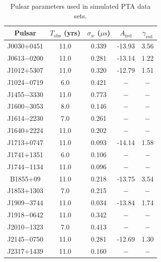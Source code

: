 \documentclass[twocolumn,aps,prd,superscriptaddress]{revtex4-1}
\begin{document}
\begin{table}[!tb]
	\setlength{\tabcolsep}{5pt}
	\caption{Pulsar parameters used in simulated PTA data sets.}
	\begin{center}
	\begin{tabular}{ccccc}
		\hline\hline
    		Pulsar	& $T_\mathrm{obs}$ (yrs) & $\sigma_w$ ($\mu\mathrm{s}$) & $A_\mathrm{red}$ & $\gamma_\mathrm{red}$ \\
		\hline
		J0030+0451 & 11.0 & 0.339 & -13.93 & 3.56 \\
		J0613$-$0200 & 11.0 & 0.281 & -13.14 & 1.22 \\
		J1012+5307 & 11.0 & 0.320 & -12.79 & 1.51 \\
		J1024$-$0719 & 6.0 &0.421 & $-$ & $-$ \\
		J1455$-$3330 & 11.0 & 0.773 & $-$ & $-$ \\
		J1600$-$3053 & 8.0 & 0.146 & $-$ & $-$ \\
		J1614$-$2230 & 7.0 & 0.261 & $-$ & $-$ \\
		J1640+2224 & 11.0 & 0.202 & $-$ & $-$ \\
		J1713+0747 & 11.0 & 0.093 & -14.14 & 1.58 \\
		J1741+1351 & 6.0 & 0.106 & $-$ & $-$ \\
		J1744$-$1134 & 11.0 & 0.096 & $-$ & $-$ \\
		B1855+09 & 11.0 & 0.218 & -13.75 & 3.54 \\
		J1853+1303 & 7.0 & 0.215 & $-$ & $-$ \\
		J1909$-$3744 & 11.0 & 0.034  & -13.84 & 1.74  \\
		J1918$-$0642 & 11.0 & 0.342 & $-$ & $-$ \\
		J2010$-$1323 & 7.0 & 0.413 & $-$ & $-$ \\
		J2145$-$0750 & 11.0 & 0.281 & -12.69 & 1.30 \\
		J2317+1439 & 11.0 & 0.160 & $-$ & $-$ \\
    		\hline\hline
	\end{tabular}
	\end{center}
	\label{tab:sim}
\end{table}
\end{document}
